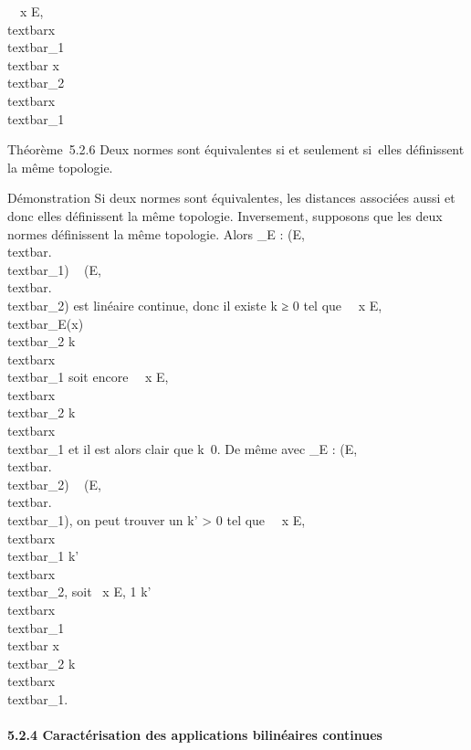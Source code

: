 \documentclass[]{article}
\begin{document}
\forall~~x \in E,\quad
\alpha~\\textbar{}x\\textbar{}\_1
\leq\\textbar{} x\\textbar{}\_2 \leq
\beta~\\textbar{}x\\textbar{}\_1

Théorème~5.2.6 Deux normes sont équivalentes si et seulement si~elles
définissent la même topologie.

Démonstration Si deux normes sont équivalentes, les distances associées
aussi et donc elles définissent la même topologie. Inversement,
supposons que les deux normes définissent la même topologie. Alors
\mathrmId\_E :
(E,\\textbar{}.\\textbar{}\_1) \rightarrow~
(E,\\textbar{}.\\textbar{}\_2) est
linéaire continue, donc il existe k ≥ 0 tel que
\forall~~x \in E,
\\textbar{}\mathrmId\_E(x)\\textbar{}\_2
\leq k\\textbar{}x\\textbar{}\_1 soit
encore \forall~~x \in E,
\\textbar{}x\\textbar{}\_2 \leq
k\\textbar{}x\\textbar{}\_1 et il
est alors clair que k\neq~0. De même avec
\mathrmId\_E :
(E,\\textbar{}.\\textbar{}\_2) \rightarrow~
(E,\\textbar{}.\\textbar{}\_1), on
peut trouver un k' \textgreater{} 0 tel que \forall~~x
\in E, \\textbar{}x\\textbar{}\_1 \leq
k'\\textbar{}x\\textbar{}\_2, soit
\forall~x \in E, 1 \over k'~
\\textbar{}x\\textbar{}\_1
\leq\\textbar{} x\\textbar{}\_2 \leq
k\\textbar{}x\\textbar{}\_1.

\paragraph{5.2.4 Caractérisation des applications bilinéaires continues}
\end{document}

